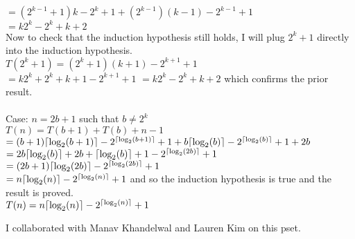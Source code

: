 \documentclass{article}
\begin{document}
\begin{enumerate}
	$	  = (2^{k-1} + 1)k - 2^k + 1 + (2^{k - 1})(k - 1) - 2^{k - 1} + 1$ \\
	$	  = k2^k - 2 ^ {k}+k +2$ \\
	Now to check that the induction hypothesis still holds, I will plug $2^k+1$ directly into the induction hypothesis.  \\
	$T(2^k+1) = (2^k+1)(k+1)-2^{k+1}+1$\\
	$		  = k2^k + 2^k + k + 1 - 2^{k+1} + 1$
	$		  = k2^k - 2^k + k + 2 $ which confirms the prior result.  \\\\
	Case: $n = 2b + 1$ such that $b\neq 2^k$ \\
	$T(n) = T(b + 1) + T(b) + n - 1$ \\
	$	  = (b+1)\lceil \textup{log}_2(b+1) \rceil - 2 ^{\lceil\textup{log}_2(b+1)\rceil} + 1 + b\lceil\textup{log}_2(b)\rceil - 2 ^ {\lceil\textup{log}_2(b)\rceil} + 1  +2b $\\
	$ 	  = 2b\lceil\textup{log}_2(b)\rceil + 2b + \lceil\textup{log}_2(b)\rceil + 1 - 2 ^{\lceil\textup{log}_2(2b)\rceil} + 1$ \\
	$	  = (2b + 1) \lceil\textup{log}_2(2b)\rceil - 2^{\lceil\textup{log}_2(2b)\rceil} + 1$ \\
	$	  = n\lceil\textup{log}_2(n)\rceil - 2 ^{\lceil\textup{log}_2(n)\rceil} + 1$ and so the induction hypothesis is true and the result is proved. \\
	$T(n) = n\lceil\textup{log}_2(n)\rceil - 2 ^ {\lceil\textup{log}_2(n)\rceil} + 1$
	\end{enumerate}

	\newpage 
	I collaborated with Manav Khandelwal and Lauren Kim on this pset.  
\end{document}
